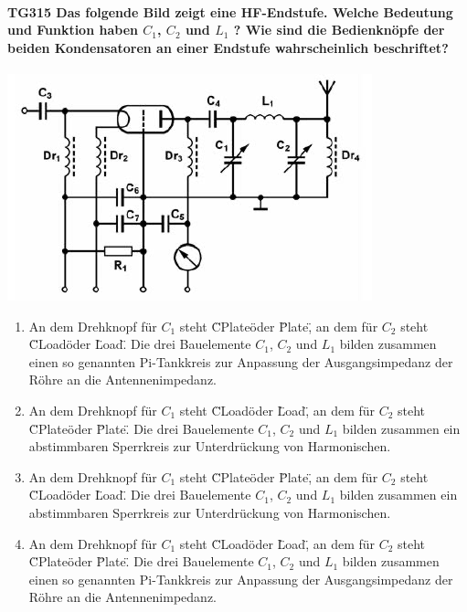 \documentclass[8pt]{article}
\begin{document}
\paragraph*{TG315 Das folgende Bild zeigt eine HF-Endstufe. Welche Bedeutung und Funktion haben $C_{1}$, $C_{2}$ und $L_{1}$ ? Wie sind die Bedienknöpfe der beiden Kondensatoren an einer Endstufe wahrscheinlich beschriftet?}
\begin{center}
	\begin{minipage}{\linewidth}
		\centering
		\includegraphics[scale=1.0]{pics/tg315_a.jpg}
	\end{minipage}
\end{center}
\begin{enumerate}[nolistsep,label=\Alph*]
\item An dem Drehknopf für $C_{1}$ steht \"CPlate\" oder \"Plate\", an dem für $C_{2}$ steht \"CLoad\" oder \"Load\". Die drei Bauelemente $C_{1}$, $C_{2}$ und $L_{1}$ bilden zusammen einen so genannten Pi-Tankkreis zur Anpassung der Ausgangsimpedanz der Röhre an die Antennenimpedanz.
\item An dem Drehknopf für $C_{1}$ steht \"CLoad\" oder \"Load\", an dem für $C_{2}$ steht \"CPlate\" oder \"Plate\". Die drei Bauelemente $C_{1}$, $C_{2}$ und $L_{1}$ bilden zusammen ein abstimmbaren Sperrkreis zur Unterdrückung von Harmonischen.
\item An dem Drehknopf für $C_{1}$ steht \"CPlate\" oder \"Plate\", an dem für $C_{2}$ steht \"CLoad\" oder \"Load\". Die drei Bauelemente $C_{1}$, $C_{2}$ und $L_{1}$ bilden zusammen ein abstimmbaren Sperrkreis zur Unterdrückung von Harmonischen.
\item An dem Drehknopf für $C_{1}$ steht \"CLoad\" oder \"Load\", an dem für $C_{2}$ steht \"CPlate\" oder \"Plate\". Die drei Bauelemente $C_{1}$, $C_{2}$ und $L_{1}$ bilden zusammen einen so genannten Pi-Tankkreis zur Anpassung der Ausgangsimpedanz der Röhre an die Antennenimpedanz.
\end{enumerate}
\end{document}
